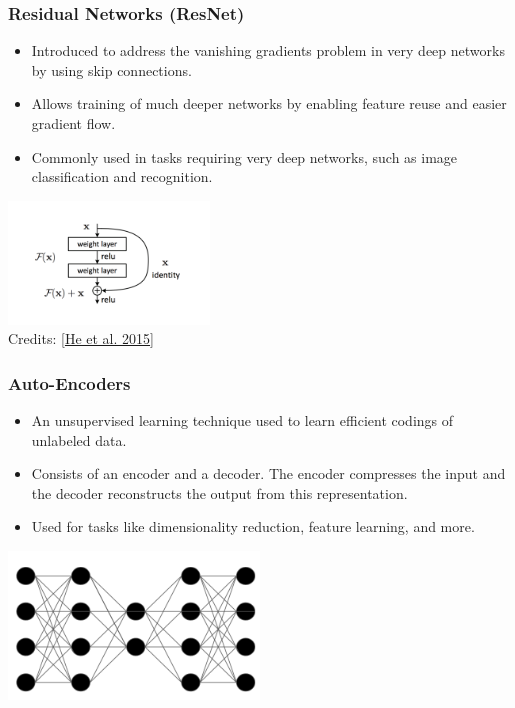 \documentclass[aspectratio=169]{../latex_main/tntbeamer}  %
\begin{document}
        \begin{frame}
        \frametitle{Residual Networks (ResNet)}
        \begin{itemize}
            \item Introduced to address the vanishing gradients problem in very deep networks by using skip connections.
            \item Allows training of much deeper networks by enabling feature reuse and easier gradient flow.
            \item Commonly used in tasks requiring very deep networks, such as image classification and recognition.
        \end{itemize}
        \centering
        \includegraphics[width=0.4\textwidth]{figures/resnet.png}\\
        Credits: [\href{https://arxiv.org/pdf/1512.03385}{He et al. 2015}]
        \end{frame}

        \begin{frame}
        \frametitle{Auto-Encoders}
        \begin{itemize}
            \item An unsupervised learning technique used to learn efficient codings of unlabeled data.
            \item Consists of an encoder and a decoder. The encoder compresses the input and the decoder reconstructs the output from this representation.
            \item Used for tasks like dimensionality reduction, feature learning, and more.
        \end{itemize}
        \centering
        \includegraphics[width=0.5\textwidth]{figures/ae.png}
        \end{frame}
\end{document}
